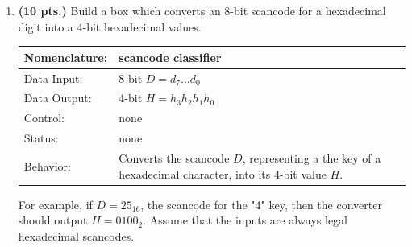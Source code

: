 \begin{enumerate}
\item {\bf (10 pts.)}
\label{page:ScanDecode}
Build a box which converts an 8-bit scancode for a hexadecimal
digit into a 4-bit hexadecimal values.

\label{page:scanconv}
\begin{tabular}{|l|p{3.5in}|} \hline
Nomenclature:  & scancode classifier                   \\ \hline
Data Input:    & 8-bit $D=d_7 \ldots d_0$          \\ \hline
Data Output:   & 4-bit $H=h_3h_2h_1h_0$ \\ \hline
Control:       & none             \\ \hline
Status:        & none                                   \\ \hline
Behavior:      & Converts the scancode $D$, representing a the
		key of a hexadecimal character, into its 4-bit 
		value $H$.
		 \\ \hline
\end{tabular}

For example, if $D=25_{16}$, the scancode for the "4" key, then the converter
should output $H=0100_2$.  Assume that the inputs are always
legal hexadecimal scancodes.

\end{enumerate}

